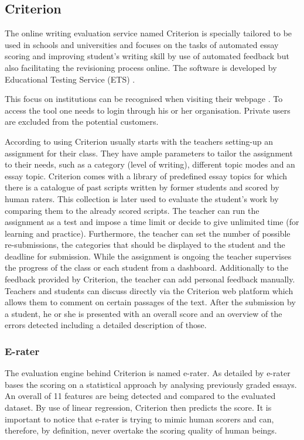 \documentclass[runningheads]{llncs}
\let\OldTextregistered\textregistered
\renewcommand{\textregistered}{\OldTextregistered\xspace}
\begin{document}
\subsection{Criterion\textregistered}
The online writing evaluation service named Criterion\textregistered is specially tailored to be used in schools and universities and focuses on the tasks of automated essay scoring and improving student's writing skill by use of automated feedback but also facilitating the revisioning process online. The software is developed by Educational Testing Service (ETS) \citep{noauthor_ets_nodate}.

This focus on institutions can be recognised when visiting their webpage \citep{noauthor_ets_nodate}. To access the tool one needs to login through his or her organisation. Private users are excluded from the potential customers. 

According to \textcite{lim_review_2012} using Criterion\textregistered usually starts with the teachers setting-up an assignment for their class. They have ample parameters to tailor the assignment to their needs, such as a category (level of writing), different topic modes and an essay topic. Criterion\textregistered comes with a library of predefined essay topics for which there is a catalogue of past scripts written by former students and scored by human raters. This collection is later used to evaluate the student's work by comparing them to the already scored scripts. The teacher can run the assignment as a test and impose a time limit or decide to give unlimited time (for learning and practice). Furthermore, the teacher can set the number of possible re-submissions, the categories that should be displayed to the student and the deadline for submission. While the assignment is ongoing the teacher supervises the progress of the class or each student from a dashboard. Additionally to the feedback provided by Criterion\textregistered, the teacher can add personal feedback manually. Teachers and students can discuss directly via the Criterion\textregistered web platform which allows them to comment on certain passages of the text. After the submission by a student, he or she is presented with an overall score and an overview of the errors detected including a detailed description of those.

\subsubsection{E-rater}
The evaluation engine behind Criterion\textregistered is named e-rater\textregistered. As detailed by \textcite{lim_review_2012} e-rater\textregistered bases the scoring on a statistical approach by analysing previously graded essays. An overall of 11 features are being detected and compared to the evaluated dataset. By use of linear regression, Criterion\textregistered then predicts the score. It is important to notice that e-rater\textregistered is trying to mimic human scorers and can, therefore, by definition, never overtake the scoring quality of human beings. 
\end{document}
